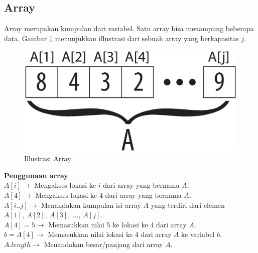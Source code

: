 \FloatBarrier
\subsection{Array}
Array merupakan kumpulan dari variabel. Satu array bisa menampung beberapa data. Gambar \ref{fig:illustrasiArray} menunjukkan illustrasi dari sebuah array yang berkapasitas $j$.
\begin{center}
	\begin{figure}[htbp]%
		\includegraphics[scale=0.4]{fig/Array.eps}%
		\caption{Illustrasi Array}%
		\label{fig:illustrasiArray}%
	\end{figure}
\end{center}
\begin{contoh}
	\textbf{Penggunaan array}\\
	$A[i] \rightarrow$ Mengakses lokasi ke $i$ dari array yang bernama $A$.\\
	$A[4] \rightarrow$ Mengakses lokasi ke $4$ dari array yang bernama $A$.\\
	$A[i..j] \rightarrow$ Menandakan kumpulan isi array $A$ yang terdiri dari elemen $A[1],\ A[2],\ A[3],\ \ldots,\ A[j]$.\\
	$A[4] = 5 \rightarrow$ Memasukkan nilai 5 ke lokasi ke 4 dari array $A$.\\
	$b = A[4] \rightarrow$ Memasukkan nilai lokasi ke 4 dari array $A$ ke variabel $b$. 
	$A.length \rightarrow$ Menandakan besar/panjang dari array $A$.
\end{contoh}

